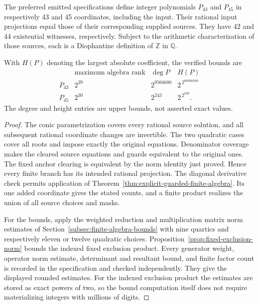 \begin{proposition}\label{prop:shared-source-compilation}
The preferred emitted specifications define integer polynomials
$P_{43}$ and $P_{45}$ in respectively 43 and 45 coordinates,
including the input.  Their rational input projections equal
those of their corresponding supplied sources.  They have 42
and 44 existential witnesses, respectively.  Subject to the
arithmetic characterization of those sources, each is a
Diophantine definition of $\mathbb Z$ in $\mathbb Q$.

With $H(P)$ denoting the largest absolute coefficient, the
verified bounds are
\[
 \begin{array}{c|c|c|c}
 &\text{maximum algebra rank}&\deg P&H(P)\\ \hline
 P_{43}&2^{29}&2^{9566680}&2^{\,2^{86098389}}\\
 P_{45}&2^{30}&2^{243}&2^{\,2^{246}}.
 \end{array}
\]
The degree and height entries are upper bounds, not asserted
exact values.
\end{proposition}
\begin{proof}
The conic parametrization covers every rational source solution,
and all subsequent rational coordinate changes are invertible.
The two quadratic cases cover all roots and impose exactly the
original equations.  Denominator coverage makes the cleared
source equations and guards equivalent to the original ones.
The fixed anchor clearing is equivalent by the norm identity
just proved.  Hence every finite branch has its intended
rational projection.  The diagonal derivative check permits
application of Theorem~\ref{thm:explicit-guarded-finite-algebra}.
Its one added coordinate gives the stated counts, and a finite
product realizes the union of all source choices and masks.

For the bounds, apply the weighted reduction and multiplication
matrix norm estimates of Section~\ref{subsec:finite-algebra-bounds}
with nine quartics and respectively eleven or twelve quadratic
choices.  Proposition~\ref{prop:fixed-exclusion-norm} bounds the
indexed fixed exclusion product.  Every generator weight,
operator norm estimate, determinant and resultant bound, and
finite factor count is recorded in the specification and checked
independently.  They give the displayed rounded estimates.  For
the indexed exclusion product the estimates are stored as exact
powers of two, so the bound computation itself does not require
materializing integers with millions of digits.
\end{proof}

